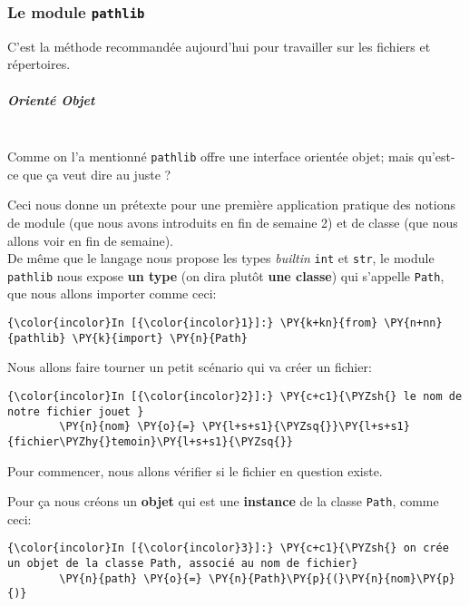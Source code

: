     \hypertarget{le-module-pathlib}{%
\subsubsection{\texorpdfstring{Le module
\texttt{pathlib}}{Le module pathlib}}\label{le-module-pathlib}}

    C'est la méthode recommandée aujourd'hui pour travailler sur les
fichiers et répertoires.

    \hypertarget{orientuxe9-objet}{%
\subparagraph{Orienté Objet\\\\}\label{orientuxe9-objet}}

    Comme on l'a mentionné \texttt{pathlib} offre une interface orientée
objet; mais qu'est-ce que ça veut dire au juste ?

Ceci nous donne un prétexte pour une première application pratique des
notions de module (que nous avons introduits en fin de semaine 2) et de
classe (que nous allons voir en fin de semaine).\\

    De même que le langage nous propose les types \emph{builtin}
\texttt{int} et \texttt{str}, le module \texttt{pathlib} nous expose
\textbf{un type} (on dira plutôt \textbf{une classe}) qui s'appelle
\texttt{Path}, que nous allons importer comme ceci:

    \begin{Verbatim}[commandchars=\\\{\}]
{\color{incolor}In [{\color{incolor}1}]:} \PY{k+kn}{from} \PY{n+nn}{pathlib} \PY{k}{import} \PY{n}{Path}
\end{Verbatim}


    Nous allons faire tourner un petit scénario qui va créer un fichier:

    \begin{Verbatim}[commandchars=\\\{\}]
{\color{incolor}In [{\color{incolor}2}]:} \PY{c+c1}{\PYZsh{} le nom de notre fichier jouet }
        \PY{n}{nom} \PY{o}{=} \PY{l+s+s1}{\PYZsq{}}\PY{l+s+s1}{fichier\PYZhy{}temoin}\PY{l+s+s1}{\PYZsq{}}
\end{Verbatim}


    Pour commencer, nous allons vérifier si le fichier en question existe.

Pour ça nous créons un \textbf{objet} qui est une \textbf{instance} de
la classe \texttt{Path}, comme ceci:

    \begin{Verbatim}[commandchars=\\\{\}]
{\color{incolor}In [{\color{incolor}3}]:} \PY{c+c1}{\PYZsh{} on crée un objet de la classe Path, associé au nom de fichier}
        \PY{n}{path} \PY{o}{=} \PY{n}{Path}\PY{p}{(}\PY{n}{nom}\PY{p}{)}
\end{Verbatim}


